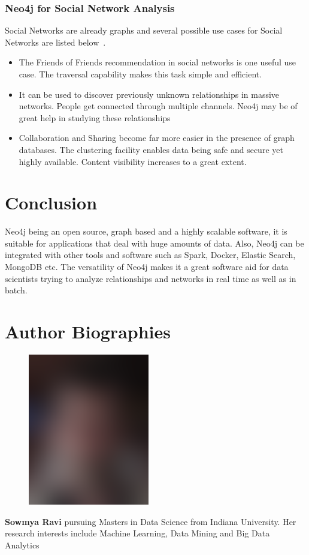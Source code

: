 \documentclass[9pt,twocolumn,twoside]{styles/osajnl}
\begin{document}
\subsubsection{Neo4j for Social Network Analysis}
Social Networks are already graphs and several possible use cases for Social Networks are listed below~\cite{www-neo4j-uc2}.
\begin{itemize}
    \item The Friends of Friends recommendation in social networks is one useful use case. The traversal capability makes this task simple and efficient. 
    \item It can be used to discover previously unknown relationships in massive networks. People get connected through multiple channels. Neo4j may be of great help in studying these relationships
    \item Collaboration and Sharing become far more easier in the presence of graph databases. The clustering facility enables data being safe and secure yet highly available. Content visibility increases to a great extent. 
\end{itemize}

\section{Conclusion}
Neo4j being an open source, graph based and a highly scalable software, it is suitable for applications that deal with huge amounts of data. Also, Neo4j can be integrated with other tools and software such as Spark, Docker, Elastic Search, MongoDB etc. The versatility of Neo4j makes it a great software aid for data scientists trying to analyze relationships and networks in real time as well as in batch. 




 
\section*{Author Biographies}
\begingroup
\setlength\intextsep{0pt}
\begin{minipage}[t][3.2cm][t]{1.0\columnwidth} %
  \begin{figure}
    \includegraphics[width=0.25\columnwidth]{images/john_smith.eps}
  \end{figure}
  \noindent
  {\bfseries Sowmya Ravi} pursuing Masters in Data Science from Indiana University. Her research interests include Machine Learning, Data Mining and Big Data Analytics
\end{minipage}

\endgroup

\newpage

\appendix
\end{document}
